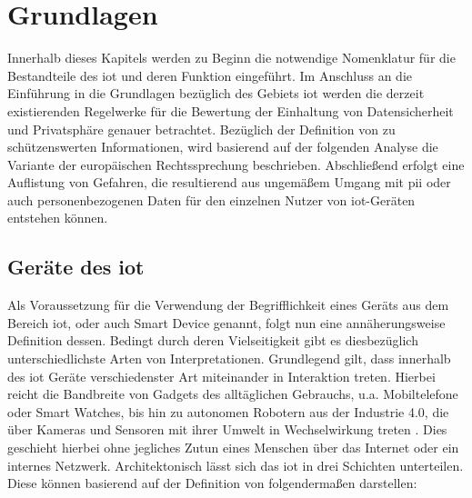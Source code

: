 
\section{Grundlagen}
\label{sec:Grundlagen}

Innerhalb dieses Kapitels werden zu Beginn die notwendige Nomenklatur für die Bestandteile des \ac{iot} und deren Funktion eingeführt. Im Anschluss an die Einführung in die Grundlagen bezüglich des Gebiets \ac{iot} werden die derzeit existierenden Regelwerke für die Bewertung der Einhaltung von Datensicherheit und Privatsphäre genauer betrachtet. Bezüglich der Definition von zu schützenswerten Informationen, wird basierend auf der folgenden Analyse die Variante der europäischen Rechtssprechung beschrieben. Abschließend erfolgt eine Auflistung von Gefahren, die resultierend aus ungemäßem Umgang mit \ac{pii} oder auch personenbezogenen Daten für den einzelnen Nutzer von \ac{iot}-Geräten entstehen können.

\subsection{Geräte des \acl{iot}}
\label{sec:Grundlagen:sssec:Geräte des Internet of Things}

Als Voraussetzung für die Verwendung der Begrifflichkeit eines Geräts aus dem Bereich \ac{iot}, oder auch Smart Device genannt, folgt nun eine annäherungsweise Definition dessen. Bedingt durch deren Vielseitigkeit gibt es diesbezüglich unterschiedlichste Arten von Interpretationen. Grundlegend gilt, dass innerhalb des \acs{iot} Geräte verschiedenster Art miteinander in Interaktion treten. Hierbei reicht die Bandbreite von Gadgets des alltäglichen Gebrauchs, u.a. Mobiltelefone oder Smart Watches, bis hin zu autonomen Robotern aus der Industrie 4.0, die über Kameras und Sensoren mit ihrer Umwelt in Wechselwirkung treten \cite{Li2015}. Dies geschieht hierbei ohne jegliches Zutun eines Menschen über das Internet oder ein internes Netzwerk. Architektonisch lässt sich das \ac{iot} in drei Schichten unterteilen. Diese können basierend auf der Definition von \cite{Seliem2018} folgendermaßen darstellen:

